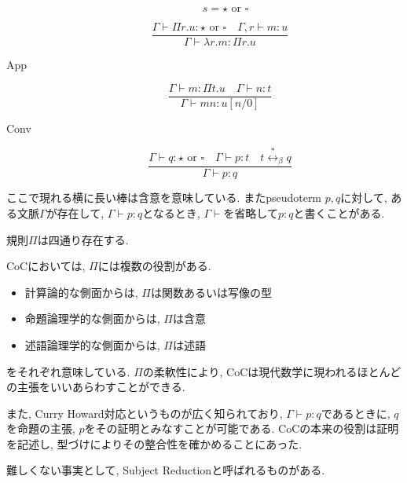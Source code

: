 \documentclass[12pt, titlepage]{ltjsarticle}
\begin{document}
\begin{defn}
\begin{description}
\[             \quad
             s = {\star} \text{ or } {\square} \]
  \item[\lambda] \[ \frac{\Gamma \vdash \Pi r. u {\colon} {\star} \text{ or } {\square} \quad \Gamma, r \vdash m : u}{\Gamma \vdash \lambda r. m {\colon} \Pi r. u} \]
  \item[App] \[ \frac{\Gamma \vdash m : \Pi t. u \quad \Gamma \vdash n : t}{\Gamma \vdash m n {\colon} u[n/0]} \]
  \item[Conv] \[\frac{\Gamma \vdash q {\colon} {\star} \text{ or } {\square} \quad \Gamma \vdash p {\colon} t \quad t \overset{*}{\leftrightarrow}_\beta q}{\Gamma \vdash p {\colon} q} \]
 \end{description}
 ここで現れる横に長い棒は含意を意味している. またpseudoterm $p, q$に対して, ある文脈$\Gamma$が存在して, $\Gamma \vdash p : q$となるとき, $\Gamma \vdash$を省略して$p : q$と書くことがある.
\end{defn}

\begin{rem}
 規則$\Pi$は四通り存在する.
\end{rem}

CoCにおいては, $\Pi$には複数の役割がある. 
\begin{itemize}
 \item 計算論的な側面からは, $\Pi$は関数あるいは写像の型
 \item 命題論理学的な側面からは, $\Pi$は含意
 \item 述語論理学的な側面からは, $\Pi$は述語
\end{itemize}
をそれぞれ意味している. $\Pi$の柔軟性により, CoCは現代数学に現われるほとんどの主張をいいあらわすことができる. 

また, Curry Howard対応というものが広く知られており, $\Gamma \vdash p : q$であるときに, $q$を命題の主張, $p$をその証明とみなすことが可能である. CoCの本来の役割は証明を記述し, 型づけによりその整合性を確かめることにあった.


難しくない事実として, Subject Reductionと呼ばれるものがある.
\end{document}
